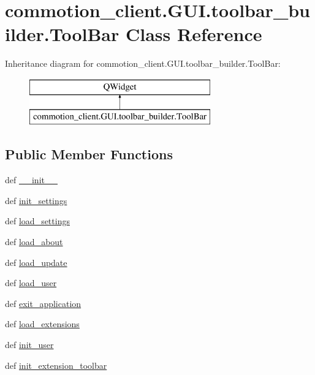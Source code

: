 \hypertarget{classcommotion__client_1_1GUI_1_1toolbar__builder_1_1ToolBar}{\section{commotion\-\_\-client.\-G\-U\-I.\-toolbar\-\_\-builder.\-Tool\-Bar Class Reference}
\label{classcommotion__client_1_1GUI_1_1toolbar__builder_1_1ToolBar}
}
Inheritance diagram for commotion\-\_\-client.\-G\-U\-I.\-toolbar\-\_\-builder.\-Tool\-Bar\-:\begin{figure}[H]
\begin{center}
\leavevmode
\includegraphics[height=2.000000cm]{classcommotion__client_1_1GUI_1_1toolbar__builder_1_1ToolBar}
\end{center}
\end{figure}
\subsection*{Public Member Functions}
\begin{DoxyCompactItemize}
\item 
def \hyperlink{classcommotion__client_1_1GUI_1_1toolbar__builder_1_1ToolBar_a86bce4db69461426435f4d6876e3e142}{\-\_\-\-\_\-init\-\_\-\-\_\-}
\item 
def \hyperlink{classcommotion__client_1_1GUI_1_1toolbar__builder_1_1ToolBar_a075b6709f65ef1aeaca34c69dd305379}{init\-\_\-settings}
\item 
def \hyperlink{classcommotion__client_1_1GUI_1_1toolbar__builder_1_1ToolBar_ab83f3bd0cdc3c0316dffaf55056c60c1}{load\-\_\-settings}
\item 
def \hyperlink{classcommotion__client_1_1GUI_1_1toolbar__builder_1_1ToolBar_a11640e9ec7f3f4dbc519824f950c6a79}{load\-\_\-about}
\item 
def \hyperlink{classcommotion__client_1_1GUI_1_1toolbar__builder_1_1ToolBar_a7d39c09c09071fba355d238cb6c1ad40}{load\-\_\-update}
\item 
def \hyperlink{classcommotion__client_1_1GUI_1_1toolbar__builder_1_1ToolBar_ad435b7c5d002f1b57e24aa7ee258085c}{load\-\_\-user}
\item 
def \hyperlink{classcommotion__client_1_1GUI_1_1toolbar__builder_1_1ToolBar_acf2126aa2356761e1112b9fa96535b44}{exit\-\_\-application}
\item 
def \hyperlink{classcommotion__client_1_1GUI_1_1toolbar__builder_1_1ToolBar_a0a0d3e80c3d039cfd2cc5d445b06b3c7}{load\-\_\-extensions}
\item 
def \hyperlink{classcommotion__client_1_1GUI_1_1toolbar__builder_1_1ToolBar_acb281187f13361c64835fa443416c8c2}{init\-\_\-user}
\item 
def \hyperlink{classcommotion__client_1_1GUI_1_1toolbar__builder_1_1ToolBar_ad033424f51c9cc7696b857b8caad00cb}{init\-\_\-extension\-\_\-toolbar}
\end{DoxyCompactItemize}
